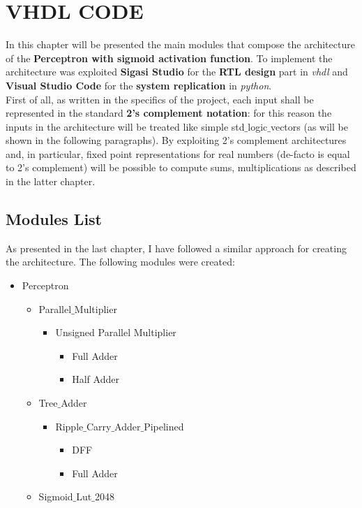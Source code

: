 \section{VHDL CODE}
In this chapter will be presented the main modules that compose the architecture of the \textbf{Perceptron with sigmoid activation function}. To implement the architecture was exploited \textbf{Sigasi  Studio} for the \textbf{RTL design} part in \textit{vhdl} and \textbf{Visual Studio Code} for the \textbf{system replication} in \textit{python}. \\
First of all, as written in the specifics of the project, each input shall be represented in the standard \textbf{2's complement notation}: for this reason the inputs in the architecture will be treated like simple std$\_$logic$\_$vectors (as will be shown in the following paragraphs). By exploiting 2's complement architectures and, in particular, fixed point representations for real numbers (de-facto is equal to 2's complement) will be possible to compute sums, multiplications as described in the latter chapter. 
\subsection{Modules List}
As presented in the last chapter, I have followed a similar approach for creating the architecture. The following modules were created:

\begin{itemize}
	\item Perceptron
	\begin{itemize}
		\item Parallel$\_$Multiplier
  		\begin{itemize}
  			\item Unsigned Parallel Multiplier
  			\begin{itemize}
	  			\item Full Adder
	  			\item Half Adder
  			\end{itemize}
		\end{itemize}
	\end{itemize}
	\begin{itemize}
		\item Tree$\_$Adder
		\begin{itemize}
			\item Ripple$\_$Carry$\_$Adder$\_$Pipelined
			\begin{itemize}
				\item DFF
				\item Full Adder
			\end{itemize} 
		\end{itemize} 
	\end{itemize}
	\begin{itemize}
		\item Sigmoid$\_$Lut$\_$2048
	\end{itemize}
\end{itemize}

